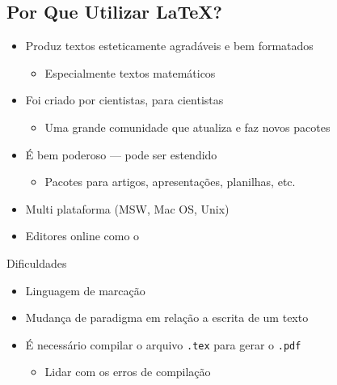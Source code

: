 \documentclass{beamer}
\begin{document}
\subsection{Por Que Utilizar \texorpdfstring{\LaTeX{}}{LaTeX}?}
\begin{frame}{\insertsubsection}
\begin{itemize}
  \item Produz  textos esteticamente agradáveis e bem formatados
  \begin{itemize}
    \item Especialmente textos matemáticos
  \end{itemize}
  \item Foi criado por cientistas, para cientistas
  \begin{itemize}
    \item Uma grande comunidade que atualiza e faz novos pacotes
  \end{itemize}
  \item É bem poderoso --- pode ser estendido
  \begin{itemize}
    \item Pacotes para artigos, apresentações, planilhas, etc.
  \end{itemize}
  \item Multi plataforma (MSW, Mac OS, Unix)
  \item Editores online como o \href{https://www.overleaf.com?r=866fdb7a&rm=d&rs=b}{\wllogo} %
\end{itemize}

\begin{block}{Dificuldades}
\begin{itemize}
  \item Linguagem de marcação
  \item Mudança de paradigma em relação a escrita de um texto
  \item É necessário compilar o arquivo \texttt{.tex} para gerar o \texttt{.pdf}
  \begin{itemize}
    \item Lidar com os erros de compilação
  \end{itemize}
\end{itemize}
\end{block}
\end{frame}

\end{document}
